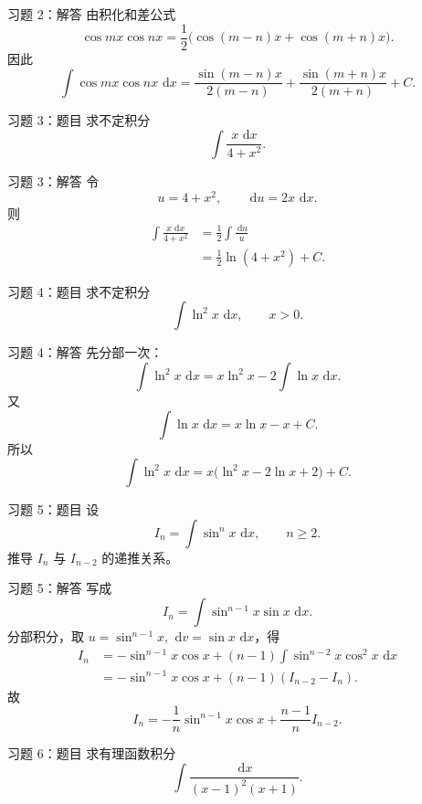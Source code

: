 \documentclass[aspectratio=169,10pt]{ctexbeamer}
\newcommand{\dd}{\,\mathrm{d}}
\begin{document}
\begin{frame}[t]{习题 2：解答}
\small
由积化和差公式
\[
  \cos mx\cos nx
  =\frac12\bigl(\cos(m-n)x+\cos(m+n)x\bigr).
\]
因此
\[
\boxed{
\int\cos mx\cos nx\,\dd x
=\frac{\sin(m-n)x}{2(m-n)}
+\frac{\sin(m+n)x}{2(m+n)}+C.}
\]
\end{frame}

\begin{frame}[t]{习题 3：题目}
\small
求不定积分
\[
  \int\frac{x\,\dd x}{4+x^2}.
\]
\end{frame}

\begin{frame}[t]{习题 3：解答}
\small
令
\[
  u=4+x^2,\qquad \dd u=2x\,\dd x.
\]
则
\[
\begin{aligned}
\int\frac{x\,\dd x}{4+x^2}
&=\frac12\int\frac{\dd u}{u}\\
&=\frac12\ln(4+x^2)+C.
\end{aligned}
\]
\end{frame}

\begin{frame}[t]{习题 4：题目}
\small
求不定积分
\[
  \int \ln^2x\,\dd x,\qquad x>0.
\]
\end{frame}

\begin{frame}[t]{习题 4：解答}
\small
先分部一次：
\[
\int\ln^2x\,\dd x=x\ln^2x-2\int\ln x\,\dd x.
\]
又
\[
  \int\ln x\,\dd x=x\ln x-x+C.
\]
所以
\[
\boxed{\int\ln^2x\,\dd x
=x\bigl(\ln^2x-2\ln x+2\bigr)+C.}
\]
\end{frame}

\begin{frame}[t]{习题 5：题目}
\small
设
\[
  I_n=\int\sin^n x\,\dd x,\qquad n\ge2.
\]
推导 $I_n$ 与 $I_{n-2}$ 的递推关系。
\end{frame}

\begin{frame}[t]{习题 5：解答}
\small
写成
\[
  I_n=\int\sin^{n-1}x\sin x\,\dd x.
\]
分部积分，取 $u=\sin^{n-1}x,\ \dd v=\sin x\,\dd x$，得
\[
\begin{aligned}
I_n
&=-\sin^{n-1}x\cos x
 +(n-1)\int\sin^{n-2}x\cos^2x\,\dd x\\
&=-\sin^{n-1}x\cos x+(n-1)(I_{n-2}-I_n).
\end{aligned}
\]
故
\[
\boxed{I_n=-\frac1n\sin^{n-1}x\cos x+\frac{n-1}{n}I_{n-2}.}
\]
\end{frame}

\begin{frame}[t]{习题 6：题目}
\small
求有理函数积分
\[
  \int\frac{\dd x}{(x-1)^2(x+1)}.
\]
\end{frame}
\end{document}
